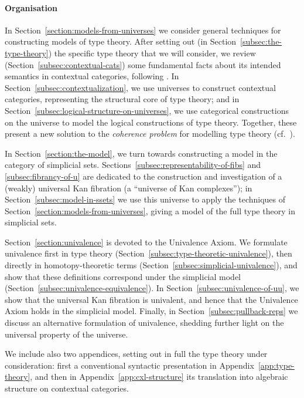\paragraph{Organisation} In Section~\ref{section:models-from-universes} we consider general techniques for constructing models of type theory. After setting out (in Section~\ref{subsec:the-type-theory}) the specific type theory that we will consider, we review (Section~\ref{subsec:contextual-cats}) some fundamental facts about its intended semantics in contextual categories, following \cite{streicher:book}.  In Section~\ref{subsec:contextualization}, we use universes to construct contextual categories, representing the structural core of type theory; and in Section~\ref{subsec:logical-structure-on-universes}, we use categorical constructions on the universe to model the logical constructions of type theory.  Together, these present a new solution to the \emph{coherence problem} for modelling type theory (cf.\ \cite{hofmann:on-the-interpretation}).

In Section~\ref{section:the-model}, we turn towards constructing a model in the category of simplicial sets. Sections~\ref{subsec:representability-of-fibs} and \ref{subsec:fibrancy-of-u} are dedicated to the construction and investigation of a (weakly) universal Kan fibration (a “universe of Kan complexes”); in Section~\ref{subsec:model-in-ssets} we use this universe to apply the techniques of Section~\ref{section:models-from-universes}, giving a model of the full type theory in simplicial sets.

Section~\ref{section:univalence} is devoted to the Univalence Axiom.   We formulate univalence first in type theory (Section~\ref{subsec:type-theoretic-univalence}), then directly in homotopy-theoretic terms (Section~\ref{subsec:simplicial-univalence}), and show that these definitions correspond under the simplicial model (Section~\ref{subsec:univalence-equivalence}).  In Section~\ref{subsec:univalence-of-uu}, we show that the universal Kan fibration is univalent, and hence that the Univalence Axiom holds in the simplicial model.  Finally, in Section~\ref{subsec:pullback-reps} we discuss an alternative formulation of univalence, shedding further light on the universal property of the universe.

We include also two appendices, setting out in full the type theory under consideration: first a conventional syntactic presentation in Appendix~\ref{app:type-theory}, and then in Appendix~\ref{app:cxl-structure} its translation into algebraic structure on contextual categories.

